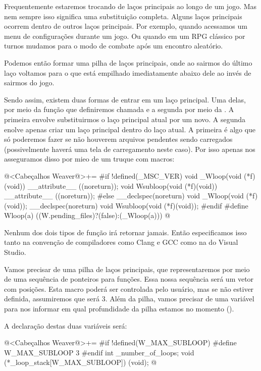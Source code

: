 
Frequentemente estaremos trocando de laços principais ao longo de um
jogo. Mas nem sempre isso significa uma substituição completa. Alguns
laços principais ocorrem dentro de outros laços principais. Por
exemplo, quando acessamos um menu de configurações durante um jogo. Ou
quando em um RPG clássico por turnos mudamos para o modo de combate
após um encontro aleatório.

Podemos então formar uma pilha de laços principais, onde ao sairmos do
último laço voltamos para o que está empilhado imediatamente abaixo
dele ao invés de sairmos do jogo.

Sendo assim, existem duas formas de entrar em um laço principal. Uma
delas, por meio da função que definiremos chamada  e
a segunda por meio da . A primeira envolve
substituirmos o laço principal atual por um novo. A segunda enolve
apenas criar um laço principal dentro do laço atual. A primeira é algo
que só poderemos fazer se não houverem arquivos pendentes sendo
carregados (possivelmente haverá uma tela de carregamento neste
caso). Por isso apenas nos asseguramos disso por mieo de um truque com
macros:

\iniciocodigo
@<Cabeçalhos Weaver@>+=
#if !defined(_MSC_VER)
void _Wloop(void (*f)(void)) __attribute__ ((noreturn));
void Wsubloop(void (*f)(void)) __attribute__ ((noreturn));
#else
__declspec(noreturn) void _Wloop(void (*f)(void));
__declspec(noreturn) void Wsubloop(void (*f)(void));
#endif
#define Wloop(a) ((W.pending_files)?(false):(_Wloop(a)))
@
\fimcodigo

Nenhum dos dois tipos de função irá retornar jamais. Então
especificamos isso tanto na convenção de compiladores como Clang e GCC
como na do Visual Studio.

Vamos precisar de uma pilha de laços principais, que representaremos
por meio de uma sequência de ponteiros para funções. Essa nossa
sequência será um vetor com 
posições. Esta macro poderá ser controlada pelo usuário, mas se não
estiver definida, assumiremos que será 3. Além da pilha, vamos
precisar de uma variável para nos informar em qual profundidade da
pilha estamos no momento ().

A declaração destas duas variáveis será:

\iniciocodigo
@<Cabeçalhos Weaver@>+=
#if !defined(W_MAX_SUBLOOP)
#define W_MAX_SUBLOOP 3
#endif
int _number_of_loops;
void (*_loop_stack[W_MAX_SUBLOOP]) (void);
@
\fimcodigo

